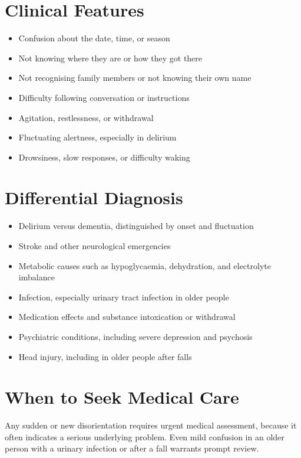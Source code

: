 \section*{Clinical Features}
\begin{itemize}
    \item Confusion about the date, time, or season
    \item Not knowing where they are or how they got there
    \item Not recognising family members or not knowing their own name
    \item Difficulty following conversation or instructions
    \item Agitation, restlessness, or withdrawal
    \item Fluctuating alertness, especially in delirium
    \item Drowsiness, slow responses, or difficulty waking
\end{itemize}

\section*{Differential Diagnosis}
\begin{itemize}
    \item Delirium versus dementia, distinguished by onset and fluctuation
    \item Stroke and other neurological emergencies
    \item Metabolic causes such as hypoglycaemia, dehydration, and electrolyte imbalance
    \item Infection, especially urinary tract infection in older people
    \item Medication effects and substance intoxication or withdrawal
    \item Psychiatric conditions, including severe depression and psychosis
    \item Head injury, including in older people after falls
\end{itemize}

\section*{When to Seek Medical Care}
Any sudden or new disorientation requires urgent medical assessment, because it often indicates a serious underlying problem. Even mild confusion in an older person with a urinary infection or after a fall warrants prompt review.

